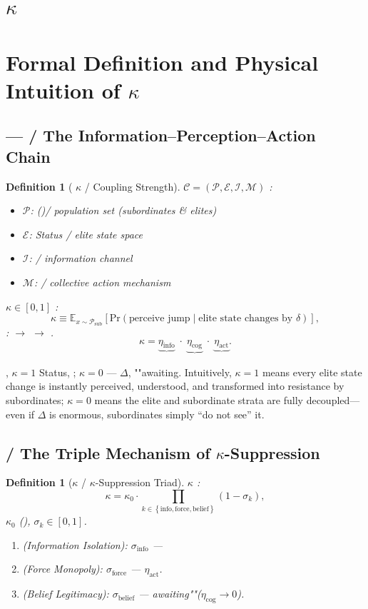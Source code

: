 \documentclass[11pt,a4paper]{article}
\newtheorem{definition}[theorem]{Definition}
\theoremstyle{definition}
\newcommand{\civ}{\mathcal{C}}
\newcommand{\coupling}{\kappa}
\newcommand{\suppress}{\sigma}
\newcommand{\paren}[1]{\left(#1\right)}
\newcommand{\bracket}[1]{\left[#1\right]}
\newcommand{\set}[1]{\left\{#1\right\}}
\begin{document}
\section{$\coupling$}
\section{Formal Definition and Physical Intuition of $\coupling$}
\subsection{--- / The Information--Perception--Action Chain}
\begin{definition}[ $\coupling$ / Coupling Strength]
\label{def:coupling}
 $\civ = (\mathcal{P}, \mathcal{E}, \mathcal{I}, \mathcal{M})$ : 
\begin{itemize}
 \item $\mathcal{P}$: ()/ population set (subordinates \& elites)
 \item $\mathcal{E}$: Status / elite state space
 \item $\mathcal{I}$: / information channel
 \item $\mathcal{M}$: / collective action mechanism
\end{itemize}
 $\coupling \in [0,1]$ : 
\[
\coupling \equiv \mathbb{E}_{x \sim \mathcal{P}_{\text{sub}}}\bracket{
 \text{Pr}\paren{\text{perceive jump} \mid \text{elite state changes by } \delta}
},
\]
:  $\to$  $\to$ .
\[
\coupling = \underbrace{\eta_{\text{info}}}_{\text{}} \;\cdot\;
 \underbrace{\eta_{\text{cog}}}_{\text{}} \;\cdot\;
 \underbrace{\eta_{\text{act}}}_{\text{}}.
\]
\end{definition}
, $\coupling = 1$ Status, ; 
$\coupling = 0$ --- $\Delta$, ""awaiting.
Intuitively, $\coupling = 1$ means every elite state change is instantly perceived, understood,
and transformed into resistance by subordinates; $\coupling = 0$ means the elite and subordinate
strata are fully decoupled---even if $\Delta$ is enormous, subordinates simply ``do not see'' it.
\subsection{ / The Triple Mechanism of $\coupling$-Suppression}
\begin{definition}[$\coupling$ / $\coupling$-Suppression Triad]
\label{def:triad}
 $\coupling$ : 
\[
\coupling = \coupling_0 \cdot \prod_{k \in \set{\text{info}, \text{force}, \text{belief}}}
 \paren{1 - \suppress_k},
\]
 $\coupling_0$ (), $\suppress_k \in [0,1]$.
\begin{enumerate}
 \item (Information Isolation): $\suppress_{\text{info}}$ ---
 \item (Force Monopoly): $\suppress_{\text{force}}$ ---
 $\eta_{\text{act}}$.
 \item (Belief Legitimacy): $\suppress_{\text{belief}}$ ---
 awaiting""($\eta_{\text{cog}} \to 0$).
\end{enumerate}
\end{definition}
\end{document}
